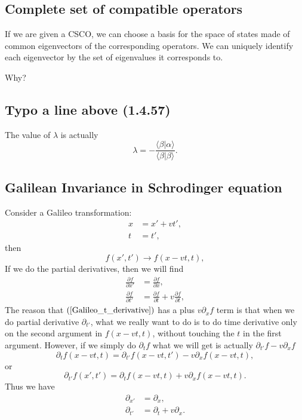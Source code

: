 \documentclass[10pt]{article}
\begin{document}
	\subsection{Complete set of compatible operators}

	If we are given a CSCO, we can choose a basis for the space of states made of common eigenvectors of the corresponding operators. We can uniquely identify each eigenvector by the set of eigenvalues it corresponds to.

	Why?

	\subsection{Typo a line above (1.4.57)}

	The value of $\lambda$ is actually
	\begin{equation}
		\lambda = - \frac{\langle \beta | \alpha \rangle}{\langle \beta | \beta \rangle}.
	\end{equation}

	\subsection{Galilean Invariance in Schrodinger equation}

	Consider a Galileo transformation:
	\begin{align*}
		x &= x' + v t', \\
		t &= t',
	\end{align*}
	then
	\begin{equation}
		f(x',t') \to f(x-vt,t),
	\end{equation}
	If we do the partial derivatives, then we will find
	\begin{align}
		\frac{\partial f}{\partial x'} &= \frac{\partial f }{\partial x}, \\
		\frac{\partial f}{\partial t'} &= \frac{\partial f }{\partial t } + v \frac{\partial f }{\partial t }, \label{Galileo_t_derivative}
	\end{align}
	The reason that $(\ref{Galileo_t_derivative})$ has a plus $v \partial_x f$ term is that when we do partial derivative $\partial_{t'}$, what we really want to do is to do time derivative only on the second argument in $f(x-vt,t)$, without touching the $t$ in the first argument. However, if we simply do $\partial_t f$ what we will get is actually $\partial_{t'} f - v \partial_x f$
	\begin{equation*}
		\partial_t f(x-vt,t) = \partial_{t'} f(x-vt, t') - v\partial_x f(x-vt,t),
	\end{equation*}
	or
	\begin{equation}
		\partial_{t'} f(x', t') = \partial_t f(x-vt,t) + v\partial_x f(x-vt,t).
	\end{equation}
	Thus we have
	\begin{align}
		\partial_{x'} &= \partial_x, \\
		\partial_{t'} &= \partial_t + v \partial_x.
	\end{align}
\end{document}
